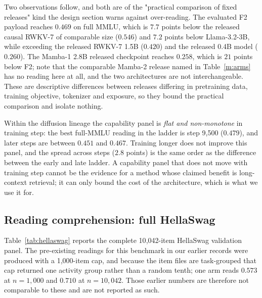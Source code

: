Two observations follow, and both are of the "practical comparison of fixed releases"
kind the design section warns against over-reading. The evaluated F2 payload reaches
$0.469$ on full MMLU, which is $7.7$ points below the released causal RWKV-7 of comparable
size ($0.546$) and $7.2$ points below Llama-3.2-3B, while exceeding the released
RWKV-7 1.5B ($0.420$) and the released 0.4B model ($0.260$). The Mamba-1 2.8B released checkpoint reaches $0.258$, which is $21$ points below
F2; note that the comparable Mamba-2 release named in Table~\ref{m:arms} has no reading
here at all, and the two architectures are not interchangeable. These are descriptive differences between releases differing in
pretraining data, training objective, tokenizer and exposure, so they bound the practical
comparison and isolate nothing.

Within the diffusion lineage the capability panel is \emph{flat and non-monotone} in
training step: the best full-MMLU reading in the ladder is step 9{,}500
($0.479$), and later steps are between $0.451$ and $0.467$. Training longer does not
improve this panel, and the spread across steps ($2.8$ points) is the same order as the
difference between the early and late ladder. A capability panel that does not move with
training step cannot be the evidence for a method whose claimed benefit is long-context
retrieval; it can only bound the cost of the architecture, which is what we use it for.

\subsection{Reading comprehension: full HellaSwag}
\label{m:hellaswag}

Table~\ref{tab:hellaswag} reports the complete 10{,}042-item HellaSwag validation panel.
The pre-existing readings for this benchmark in our earlier records were produced with a
1{,}000-item cap, and because the item files are task-grouped that cap returned one
activity group rather than a random tenth; one arm reads $0.573$ at $n=1{,}000$ and
$0.710$ at $n=10{,}042$. Those earlier numbers are therefore not comparable to these and
are not reported as such.

